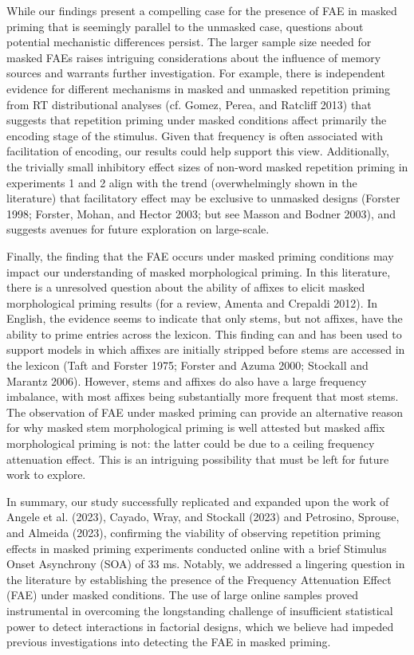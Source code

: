 \documentclass[
]{interact}
\begin{document}
While our findings present a compelling case for the presence of FAE in
masked priming that is seemingly parallel to the unmasked case,
questions about potential mechanistic differences persist. The larger
sample size needed for masked FAEs raises intriguing considerations
about the influence of memory sources and warrants further
investigation. For example, there is independent evidence for different
mechanisms in masked and unmasked repetition priming from RT
distributional analyses (cf. Gomez, Perea, and Ratcliff 2013) that
suggests that repetition priming under masked conditions affect
primarily the encoding stage of the stimulus. Given that frequency is
often associated with facilitation of encoding, our results could help
support this view. Additionally, the trivially small inhibitory effect
sizes of non-word masked repetition priming in experiments 1 and 2 align
with the trend (overwhelmingly shown in the literature) that
facilitatory effect may be exclusive to unmasked designs (Forster 1998;
Forster, Mohan, and Hector 2003; but see Masson and Bodner 2003), and
suggests avenues for future exploration on large-scale.

Finally, the finding that the FAE occurs under masked priming conditions
may impact our understanding of masked morphological priming. In this
literature, there is a unresolved question about the ability of affixes
to elicit masked morphological priming results (for a review, Amenta and
Crepaldi 2012). In English, the evidence seems to indicate that only
stems, but not affixes, have the ability to prime entries across the
lexicon. This finding can and has been used to support models in which
affixes are initially stripped before stems are accessed in the lexicon
(Taft and Forster 1975; Forster and Azuma 2000; Stockall and Marantz
2006). However, stems and affixes do also have a large frequency
imbalance, with most affixes being substantially more frequent that most
stems. The observation of FAE under masked priming can provide an
alternative reason for why masked stem morphological priming is well
attested but masked affix morphological priming is not: the latter could
be due to a ceiling frequency attenuation effect. This is an intriguing
possibility that must be left for future work to explore.

In summary, our study successfully replicated and expanded upon the work
of Angele et al. (2023), Cayado, Wray, and Stockall (2023) and
Petrosino, Sprouse, and Almeida (2023), confirming the viability of
observing repetition priming effects in masked priming experiments
conducted online with a brief Stimulus Onset Asynchrony (SOA) of 33 ms.
Notably, we addressed a lingering question in the literature by
establishing the presence of the Frequency Attenuation Effect (FAE)
under masked conditions. The use of large online samples proved
instrumental in overcoming the longstanding challenge of insufficient
statistical power to detect interactions in factorial designs, which we
believe had impeded previous investigations into detecting the FAE in
masked priming.
\end{document}
